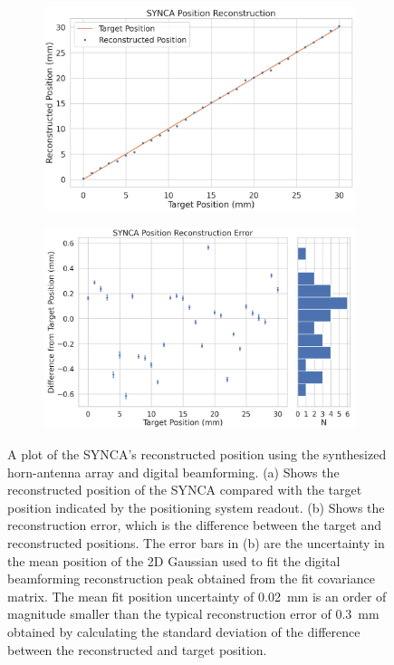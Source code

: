 \begin{figure}[htbp]
\centering 
    \begin{subfigure}[b]{0.48\textwidth}
        \centering
        \includegraphics[width=1\textwidth]{figs/Chapter-5/220920_synca_radial_position_reconstruction_sweep.png}
        \caption{\label{fig:synca-sweep-recon}}
    \end{subfigure}
    \hfill
    \begin{subfigure}[b]{0.48\textwidth}
        \centering
        \includegraphics[width=\textwidth]{figs/Chapter-5/220920_synca_reconstruction_sweep_errors_2.png}
        \caption{\label{fig:synca-sweep-error}}
    \end{subfigure}
    \hfill
\caption{\label{fig:synca-sweep} A plot of the SYNCA's reconstructed position using the synthesized horn-antenna array and digital beamforming. (a) Shows the reconstructed position of the SYNCA compared with the target position indicated by the positioning system readout. (b) Shows the reconstruction error, which is the difference between the target and reconstructed positions. The error bars in (b) are the uncertainty in the mean position of the 2D Gaussian used to fit the digital beamforming reconstruction peak obtained from the fit covariance matrix. The mean fit position uncertainty of 0.02~mm is an order of magnitude smaller than the typical reconstruction error of 0.3~mm obtained by calculating the standard deviation of the difference between the reconstructed and target position.}
\end{figure}

